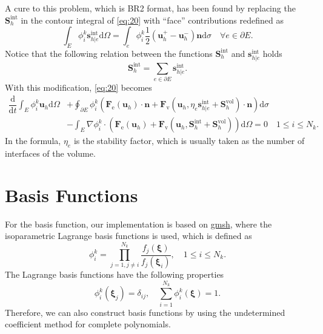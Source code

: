 \documentclass{develop-note}
\begin{document}
A cure to this problem, which is BR2 format, has been found by replacing the $\mathbf{S}_{h}^{\mathrm{int}}$ in the contour integral of \autoref{eq:20} with ``face'' contributions redefined as
\begin{equation}
  \int_{E}\phi_{i}^{k}\mathbf{s}_{h|e}^{\mathrm{int}}\mathrm{d}\Omega=\int_{e}\phi_{i}^{k}\dfrac{1}{2}(\mathbf{u}_{h}^{+}-\mathbf{u}_{h}^{-})\mathbf{n}\mathrm{d}\sigma\quad\forall e \in\partial E.
\end{equation}
Notice that the following relation between the functions $\mathbf{S}_{h}^{\mathrm{int}}$ and $\mathbf{s}_{h|e}^{\mathrm{int}}$ holds
\begin{equation}
  \mathbf{S}_{h}^{\mathrm{int}}=\sum_{e\in\partial E}\mathbf{s}_{h|e}^{\mathrm{int}}.
\end{equation}
With this modification, \autoref{eq:20} becomes
\begin{equation}
  \label{eq:23}
  \begin{aligned}
    \dfrac{\mathrm{d}}{\mathrm{d}t}\int_{E}\phi_{i}^{k}\mathbf{u}_{h}\mathrm{d}\Omega &+\oint_{\partial E}\phi_{i}^{k}(\mathbf{F}_{\mathrm{e}}(\mathbf{u}_{h})\cdot\mathbf{n}+\mathbf{F}_{\mathrm{v}}(\mathbf{u}_{h},\eta_{e}\mathbf{s}_{h|e}^{\mathrm{int}}+\mathbf{S}_{h}^{\mathrm{vol}})\cdot\mathbf{n})\mathrm{d}\sigma\\
    &-\int_{E}\nabla\phi_{i}^{k}\cdot(\mathbf{F}_{\mathrm{e}}(\mathbf{u}_{h})+\mathbf{F}_{\mathrm{v}}(\mathbf{u}_{h},\mathbf{S}_{h}^{\mathrm{int}}+\mathbf{S}_{h}^{\mathrm{vol}}))\mathrm{d}\Omega=0\quad 1\leqslant i\leqslant N_{k}.
  \end{aligned}
\end{equation}
In the formula, $\eta_{e}$ is the stability factor, which is usually taken as the number of interfaces of the volume.

\section{Basis Functions}

For the basis function, our implementation is based on \href{https://gmsh.info}{gmsh}, where the isoparametric Lagrange basis functions is used, which is defined as
\begin{equation}
  \phi_{i}^{k}=\prod_{j=1,j\neq i}^{N_{k}}\dfrac{f_{j}(\bm{\xi})}{f_{j}(\bm{\xi}_{i})},\quad 1\leqslant i\leqslant N_{k}.
\end{equation}
The Lagrange basis functions have the following properties
\begin{equation}
  \phi_{i}^{k}(\bm{\xi}_{j})=\delta_{ij},\quad \sum_{i=1}^{N_{k}}\phi_{i}^{k}(\bm{\xi})=1.
\end{equation}
Therefore, we can also construct basis functions by using the undetermined coefficient method for complete polynomials.
\end{document}
